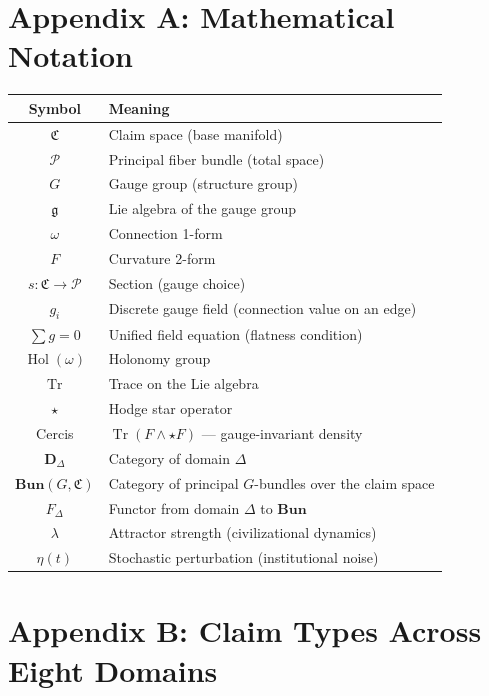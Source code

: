 \documentclass[12pt,a4paper]{article}
\theoremstyle{plain}
\theoremstyle{definition}
\newcommand{\Pcal}{\mathcal{P}}
\newcommand{\Lie}{\mathfrak{g}}
\newcommand{\curv}{F}
\newcommand{\conn}{\omega}
\newcommand{\BundleCat}{\mathbf{Bun}}
\newcommand{\ClaimSpace}{\mathfrak{C}}
\DeclareMathOperator{\Tr}{Tr}
\DeclareMathOperator{\Hol}{Hol}
\begin{document}
\section{Appendix A: Mathematical Notation}

\begin{center}
\begin{tabular}{c|l}
    \toprule
    \textbf{Symbol} & \textbf{Meaning} \\
    \midrule
    $\ClaimSpace$ & Claim space (base manifold) \\
    $\Pcal$ & Principal fiber bundle (total space) \\
    $G$ & Gauge group (structure group) \\
    $\Lie$ & Lie algebra of the gauge group \\
    $\conn$ & Connection 1-form \\
    $\curv$ & Curvature 2-form \\
    $s: \ClaimSpace \to \Pcal$ & Section (gauge choice) \\
    $g_i$ & Discrete gauge field (connection value on an edge) \\
    $\sum g = 0$ & Unified field equation (flatness condition) \\
    $\Hol(\conn)$ & Holonomy group \\
    $\Tr$ & Trace on the Lie algebra \\
    $\star$ & Hodge star operator \\
    Cercis & $\Tr(\curv \wedge \star \curv)$ — gauge-invariant density \\
    $\mathbf{D}_\Delta$ & Category of domain $\Delta$ \\
    $\BundleCat(G, \ClaimSpace)$ & Category of principal $G$-bundles over the claim space \\
    $F_\Delta$ & Functor from domain $\Delta$ to $\BundleCat$ \\
    $\lambda$ & Attractor strength (civilizational dynamics) \\
    $\eta(t)$ & Stochastic perturbation (institutional noise) \\
    \bottomrule
\end{tabular}
\end{center}

\section{Appendix B: Claim Types Across Eight Domains}
\end{document}
